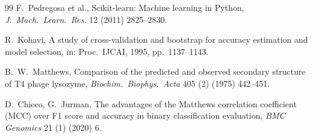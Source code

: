 \documentclass[preprint,12pt,authoryear]{elsarticle}
\begin{document}
\begin{thebibliography}{99}
F.~Pedregosa et al., Scikit-learn: Machine learning in Python, \textit{J.\ Mach.\
Learn.\ Res.} 12 (2011) 2825--2830.

R.~Kohavi, A study of cross-validation and bootstrap for accuracy estimation and
model selection, in: Proc.\ IJCAI, 1995, pp.~1137--1143.

B.~W.~Matthews, Comparison of the predicted and observed secondary structure of T4
phage lysozyme, \textit{Biochim.\ Biophys.\ Acta} 405 (2) (1975) 442--451.

D.~Chicco, G.~Jurman, The advantages of the Matthews correlation coefficient (MCC)
over F1 score and accuracy in binary classification evaluation, \textit{BMC
Genomics} 21 (1) (2020) 6.

\end{thebibliography}
\end{document}

